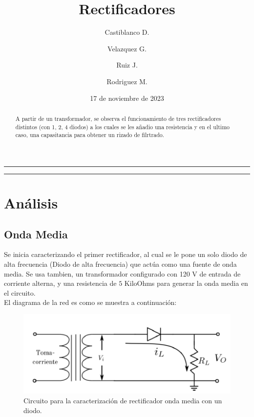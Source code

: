 \documentclass[10pt,letterpaper]{article}
\author[1]{Castiblanco D.}
\author[2]{Velazquez G.}
\author[3]{Ruiz J.}
\author[4]{Rodriguez M.}
\affil[1, 2, 3, 4]{Departmento de física\\
Universidad Nacional de Colombia - Bogotá}
\title{ \Huge Rectificadores}
\date{17 de noviembre de 2023}
\begin{document}
\maketitle

\begin{center}\rule{\textwidth}{0.1mm}
\end{center}
\begin{center}\vspace{0.2cm}

	\begin{abstract}
		A partir de un transformador, se observa el funcionamiento de tres rectificadores distintos (con 1, 2, 4 diodos) a los cuales se les añadio una resistencia y en el ultimo caso, una capasitancia para obtener un rizado de filrtrado.

	\end{abstract}

\end{center}


\begin{center}\rule{\textwidth}{0.1mm}\end{center}

\section{Análisis}

\subsection{Onda Media}

Se inicia caracterizando el primer rectificador, al cual se le pone un solo diodo de alta frecuencia (Diodo de alta frecuencia) que actúa como una fuente de onda media.
Se usa tambien, un transformador configurado con 120 V de entrada de corriente alterna,
y una resistencia de $5$ KiloOhms para generar la onda media en el circuito.
\\ El diagrama de la red es como se muestra a continuación:

\begin{figure}[H]
	\centering
	\includegraphics[scale=1.5]{OndaMedia.png}
	\caption{Circuito para la caracterización de rectificador onda media con un diodo.}
	\label{salida}
\end{figure}
\end{document}
